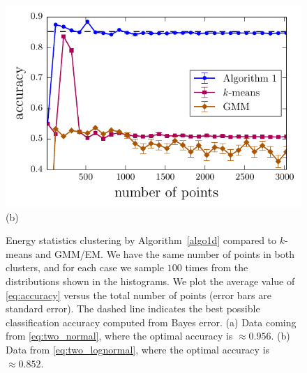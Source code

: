 \documentclass[aps,preprint,nofootinbib,floatfix]{revtex4-1}
\begin{document}
\begin{figure}
\begin{minipage}{0.49\textwidth}
\includegraphics[width=\textwidth]{loggauss1d.pdf}\\[-1em]
(b)
\end{minipage}
\caption{
\label{fig:1d}
Energy statistics clustering by Algorithm~\ref{algo1d}
compared to $k$-means and GMM/EM.
We have the same number of points in both clusters, and for each case
we sample $100$ times from the distributions shown in the histograms. We 
plot the average value of 
\eqref{eq:accuracy} versus the total number of points 
(error bars are standard error). The dashed line indicates the
best possible classification accuracy computed from Bayes error.
(a) Data coming from \eqref{eq:two_normal}, where the
optimal accuracy is $\approx 0.956$.
(b) Data from \eqref{eq:two_lognormal}, where the optimal
accuracy is $\approx 0.852$.
}
\end{figure}
\end{document}
